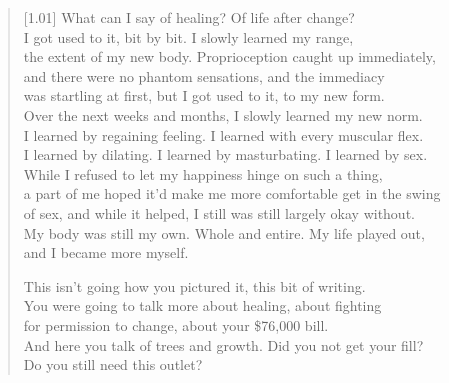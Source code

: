 \begin{verse}[1.01\textwidth]
  What can I say of healing? Of life after change?\\
  I got used to it, bit by bit. I slowly learned my range,\\
  the extent of my new body. Proprioception caught up immediately,\\
  and there were no phantom sensations, and the immediacy\\
  was startling at first, but I got used to it, to my new form.\\
  Over the next weeks and months, I slowly learned my new norm.\\
  I learned by regaining feeling. I learned with every muscular flex.\\
  I learned by dilating. I learned by masturbating. I learned by sex.\\
  While I refused to let my happiness hinge on such a thing,\\
  a part of me hoped it'd make me more comfortable get in the swing\\
  of sex, and while it helped, I still was still largely okay without.\\
  My body was still my own. Whole and entire. My life played out,\\
  and I became more myself.

  \begin{ally}
  \noindent This isn't going how you pictured it, this bit of writing.\\
  \noindent You were going to talk more about healing, about fighting\\
  \noindent for permission to change, about your \$76,000 bill.\\
  \noindent And here you talk of trees and growth. Did you not get your fill?\\
  \noindent Do you still need this outlet?
\end{ally}


\end{verse}
